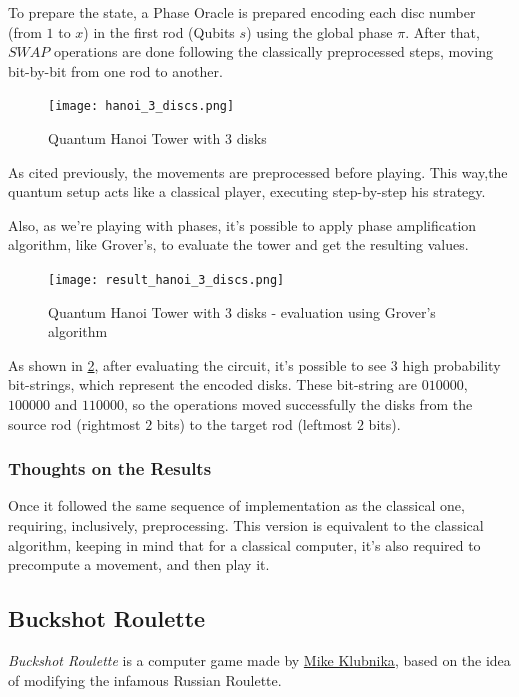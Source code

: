 \documentclass{article}
\begin{document}
To prepare the state, a Phase Oracle is prepared encoding each disc number (from $1$ to $x$) in the first rod (Qubits $s$) using the global phase $\pi$. After that, $SWAP$ operations are done following the classically preprocessed steps, moving bit-by-bit from one rod to another.

\newpage

\begin{figure}[h]
	\centering
	\texttt{[image: hanoi\_3\_discs.png]}
	\caption{Quantum Hanoi Tower with 3 disks}
	\label{fig:hanoi}
\end{figure}

As cited previously, the movements are preprocessed before playing. This way,the quantum setup acts like a classical player, executing step-by-step his strategy.

Also, as we're playing with phases, it's possible to apply phase amplification algorithm, like Grover's, to evaluate the tower and get the resulting values.

\begin{figure}[h]
	\centering
	\texttt{[image: result\_hanoi\_3\_discs.png]}
	\caption{Quantum Hanoi Tower with 3 disks - evaluation using Grover's algorithm}
	\label{fig:hanoi-result}
\end{figure}

As shown in \ref{fig:hanoi-result}, after evaluating the circuit, it's possible to see $3$ high probability bit-strings, which represent the encoded disks. These bit-string are $010000$, $100000$ and $110000$, so the operations moved successfully the disks from the source rod (rightmost $2$ bits) to the target rod (leftmost $2$ bits).

\subsubsection{Thoughts on the Results}

Once it followed the same sequence of implementation as the classical one, requiring, inclusively, preprocessing. This version is equivalent to the classical algorithm, keeping in mind that for a classical computer, it's also required to precompute a movement, and then play it.

\newpage

\subsection{Buckshot Roulette} \label{buckshot}
\emph{Buckshot Roulette} is a computer game made by \href{https://mikeklubnika.itch.io/}{Mike Klubnika}, based on the idea of modifying the infamous Russian Roulette. 
\end{document}
